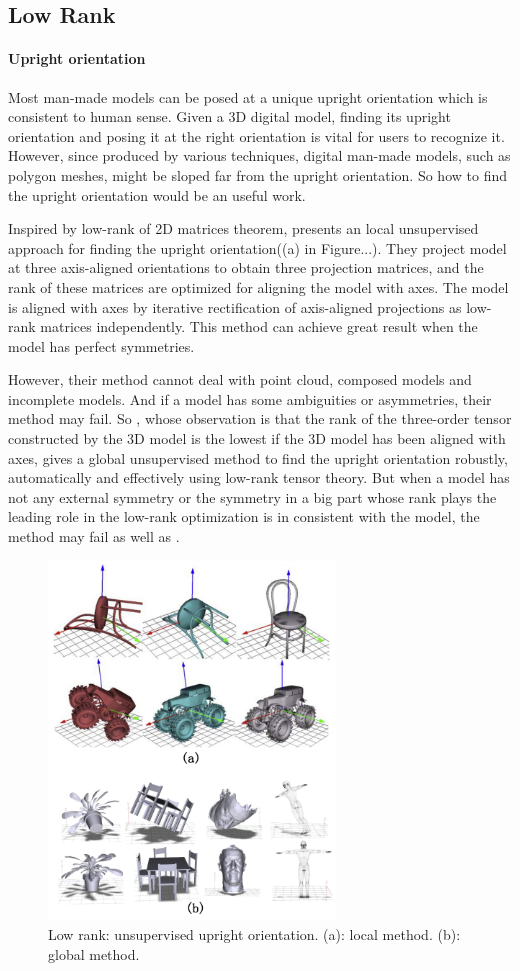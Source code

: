 \label{sec:lowrank}

\subsection{Low Rank}




\paragraph{Upright orientation}Most man-made models can be posed at a unique upright orientation which is consistent to human sense. Given a 3D digital model, finding its upright orientation and posing it at the right orientation is vital for users to recognize it. However, since produced by various techniques, digital man-made models, such as polygon meshes, might be sloped far from the upright orientation. So how to find the upright orientation would be an useful work.

Inspired by low-rank of 2D matrices theorem, \cite{jin2012unsupervised} presents an local unsupervised approach for finding the upright orientation((a) in Figure...). They project model at three axis-aligned orientations to obtain three projection matrices, and the rank of these matrices are optimized for aligning the model with axes. The model is aligned with axes by iterative rectification of axis-aligned projections as low-rank matrices independently. This method can achieve great result when the model has perfect symmetries.

However, their method cannot deal with point cloud, composed models and incomplete models. And if a model has some ambiguities or asymmetries, their method may fail. So \cite{wang2014upright}, whose observation is that the rank of the three-order tensor constructed by the 3D model is the lowest if the 3D model has been aligned with axes, gives a global unsupervised method to find the upright orientation robustly, automatically and effectively using low-rank tensor theory. But when a model has not any external symmetry or the symmetry in a big part whose rank plays the leading role in the low-rank optimization is in consistent with the model, the method may fail as well as \cite{jin2012unsupervised}.

\begin{figure}[ht]
  \centering
  \includegraphics[width=3in]{images/upright_lowrank}
  \caption{Low rank: unsupervised upright orientation. (a): local method\cite{jin2012unsupervised}. (b): global method\cite{wang2014upright}.}
\end{figure} 